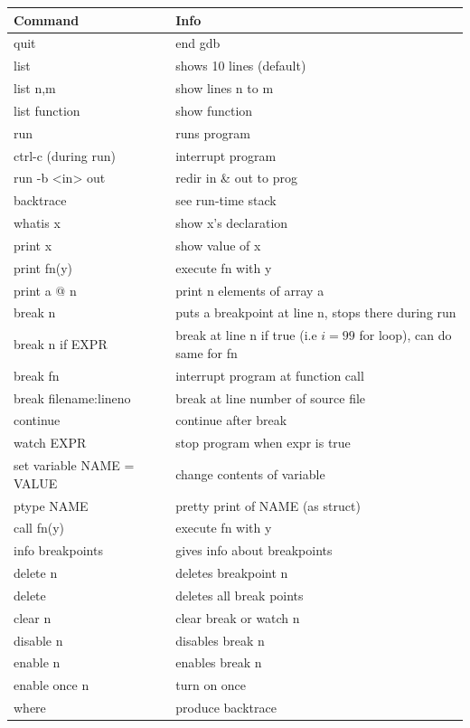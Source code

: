 \documentclass[12 pt]{article}
\begin{document}
\begin{tabularx}{1.0\linewidth}{|X|X|}
  \hline \textbf{Command}&\textbf{Info}
  \\ \hline quit & end gdb
  \\ \hline list & shows 10 lines (default)
  \\ \hline list n,m & show lines n to m
  \\ \hline list function & show function
  \\ \hline run & runs program
  \\ \hline ctrl-c (during run) & interrupt program
  \\ \hline run -b <in> out & redir in \& out to prog
  \\ \hline backtrace & see run-time stack
  \\ \hline whatis x & show x's declaration
  \\ \hline print x & show value of x
  \\ \hline print fn(y) & execute fn with y
  \\ \hline print a @ n & print n elements of array a
  \\ \hline break n & puts a breakpoint at line n, stops there during run
  \\ \hline break n if EXPR & break at line n if true (i.e $i=99$ for loop), can do same for fn
  \\ \hline break fn & interrupt program at function call
  \\ \hline break filename:lineno & break at line number of source file
  \\ \hline continue & continue after break
  \\ \hline watch EXPR & stop program when expr is true
  \\ \hline set variable NAME = VALUE & change contents of variable
  \\ \hline ptype NAME & pretty print of NAME (as struct)
  \\ \hline call fn(y) & execute fn with y
  \\ \hline info breakpoints & gives info about breakpoints
  \\ \hline delete n & deletes breakpoint n
  \\ \hline delete & deletes all break points
  \\ \hline clear n & clear break or watch n
  \\ \hline disable n & disables break n
  \\ \hline enable n & enables break n
  \\ \hline enable once n & turn on once
  \\ \hline where & produce backtrace
  \\ \hline
\end{tabularx}
\end{document}
